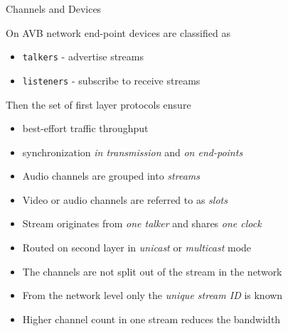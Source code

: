 \documentclass{beamer}
\begin{document}
\begin{frame}[allowframebreaks]{ Channels and Devices }

On AVB network end-point devices are classified as
\begin{itemize}
	\item \texttt{talkers} - advertise streams
	\item \texttt{listeners} - subscribe to receive streams
\end{itemize}
Then the set of first layer protocols ensure
\begin{itemize}
	\item best-effort traffic throughput
	\item synchronization \emph{in transmission} and \emph{on end-points}
\end{itemize}

\break

\begin{itemize}

\item Audio channels are grouped into \emph{streams}
\item Video or audio channels are referred to as \emph{slots}
\item Stream originates from \emph{one talker} and shares \emph{one clock}
\item Routed on second layer in \emph{unicast} or \emph{multicast} mode
\item The channels are not split out of the stream in the network
\item From the network level only the \emph{unique stream ID} is known
\item Higher channel count in one stream reduces the bandwidth

\end{itemize}

\end{frame}

\end{document}
